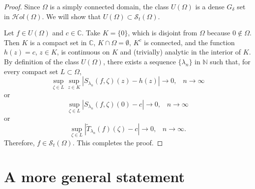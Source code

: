 \documentclass[11pt,twoside,a4paper]{article}
\theoremstyle{remark}
\def\d{\delta}
\newcommand{\holo}{{\mathcal Hol}(\Omega)}
\newcommand{\sto}{\mathcal{S}_t(\Omega)}
\newcommand{\uo}{U(\Omega)}
\begin{document}
\begin{proof}
Since $\Omega$ is a simply connected domain, the class $\uo$ is a dense $G_\d$ set in $\holo$.
  We will show that $\uo \subset \sto$.
  \par
   Let $f \in \uo$ and $c \in \mathbb{C}$. Take $K=\{0\}$, which is disjoint from $\Omega$ because $0 \notin \Omega$. Then $K$ is a compact set in $\mathbb{C}$, $K\cap \Omega = \emptyset$, $K^{c}$ is connected, and the function $h(z)=c$, $z \in K$, is continuous on $K$ and (trivially) analytic in the interior of $K$. By definition of the class $\uo$, there exists a sequence $\{\lambda_n\}$ in $\mathbb{N}$ such that, for every compact set $L \subset \Omega$,
  \begin{equation*}
    \sup\limits_{\zeta \in L}\sup\limits_{z \in K}|S_{\lambda_n}(f,\zeta)(z)-h(z)| \longrightarrow 0, \hspace{10pt} n \rightarrow \infty
  \end{equation*}
  or
  \begin{equation*}
    \sup\limits_{\zeta \in L}|S_{\lambda_n}(f,\zeta)(0)-c| \longrightarrow 0, \hspace{10pt} n \rightarrow \infty
  \end{equation*}
 or
  \begin{equation*}
    \sup\limits_{\zeta \in L}|\widetilde{T}_{\lambda_n}(f)(\zeta)-c| \longrightarrow 0, \hspace{10pt} n \rightarrow \infty.
  \end{equation*}
  Therefore, $f \in \sto$. This completes the proof.
\end{proof}
\section{A more general statement}
\end{document}
